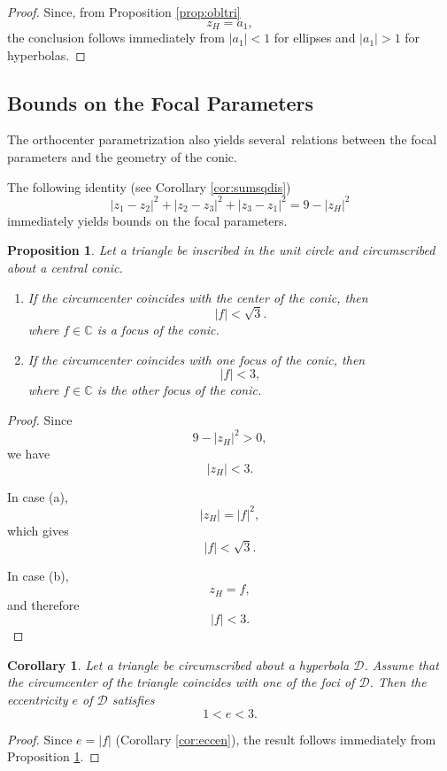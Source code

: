 \documentclass[11pt,reqno]{amsart}
\newtheorem{proposition}{Proposition}[section]
\newtheorem{corollary}{Corollary}[section]
\theoremstyle{definition}
\numberwithin{equation}{section}
\begin{document}
\begin{proof}
Since, from Proposition \ref{prop:obltri}
\[
z_H=a_1,
\]
the conclusion follows immediately from $|a_1|<1$ for ellipses and
$|a_1|>1$ for hyperbolas.
\end{proof}

\subsection{Bounds on the Focal Parameters}
The orthocenter parametrization also yields several \,relations between the focal parameters and the geometry of the conic.

The following identity (see Corollary \ref{cor:sumsqdis})
\[
|z_1-z_2|^2+|z_2-z_3|^2+|z_3-z_1|^2
=
9-|z_H|^2
\]
immediately yields bounds on the focal parameters.

\begin{proposition}\label{prop:bounds}
Let a triangle be inscribed in the unit circle and circumscribed about
a central conic.

\begin{enumerate}
\item[(a)]
If the circumcenter coincides with the center of the conic, then
\[
|f|<\sqrt3.
\]
where $f\in \mathbb C$ is a focus of the conic.
\item[(b)]
If the circumcenter coincides with one focus of the conic, then
\[
|f|<3,
\]
where $f\in \mathbb C$ is the other focus of the conic.
\end{enumerate}
\end{proposition}

\begin{proof}
Since
\[
9-|z_H|^2>0,
\]
we have
\[
|z_H|<3.
\]

In case (a),
\[
|z_H|=|f|^2,
\]
which gives
\[
|f|<\sqrt3.
\]

In case (b),
\[
z_H=f,
\]
and therefore
\[
|f|<3.
\]
\end{proof}

\begin{corollary}
Let a triangle be circumscribed about a hyperbola $\mathcal D$. Assume that the circumcenter of the triangle coincides with one of the foci of $\mathcal D$. Then the eccentricity $e$ of $\mathcal D$ satisfies
\[
1<e<3.
\]
\end{corollary}

\begin{proof}
Since $e=|f|$ (Corollary \ref{cor:eccen}), the result follows
immediately from Proposition \ref{prop:bounds}.
\end{proof}
\end{document}
